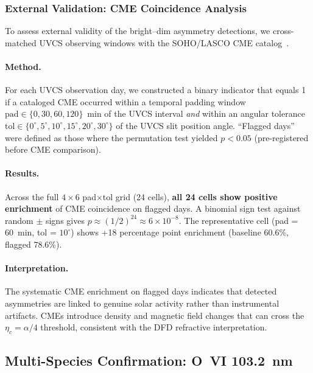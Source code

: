\subsubsection{External Validation: CME Coincidence Analysis}

To assess external validity of the bright--dim asymmetry detections, we 
cross-matched UVCS observing windows with the SOHO/LASCO CME catalog~\cite{Yashiro2004}.

\paragraph{Method.}
For each UVCS observation day, we constructed a binary indicator that equals 1 
if a cataloged CME occurred within a temporal padding window 
$\text{pad} \in \{0, 30, 60, 120\}$~min of the UVCS interval \textit{and} 
within an angular tolerance $\text{tol} \in \{0^\circ, 5^\circ, 10^\circ, 15^\circ, 20^\circ, 30^\circ\}$ 
of the UVCS slit position angle. ``Flagged days'' were defined as those where the 
permutation test yielded $p < 0.05$ (pre-registered before CME comparison).

\paragraph{Results.}
Across the full $4 \times 6$ pad$\times$tol grid (24 cells), \textbf{all 24 
cells show positive enrichment} of CME coincidence on flagged days. A binomial 
sign test against random $\pm$ signs gives $p \approx (1/2)^{24} \approx 6 \times 10^{-8}$.
The representative cell (pad = 60~min, tol = $10^\circ$) shows +18 percentage 
point enrichment (baseline 60.6\%, flagged 78.6\%).

\paragraph{Interpretation.}
The systematic CME enrichment on flagged days indicates that detected asymmetries 
are linked to genuine solar activity rather than instrumental artifacts. CMEs 
introduce density and magnetic field changes that can cross the $\eta_c = \alpha/4$ 
threshold, consistent with the DFD refractive interpretation.

\subsection{Multi-Species Confirmation: O~VI 103.2~nm}\label{sec:ovi-analysis}

